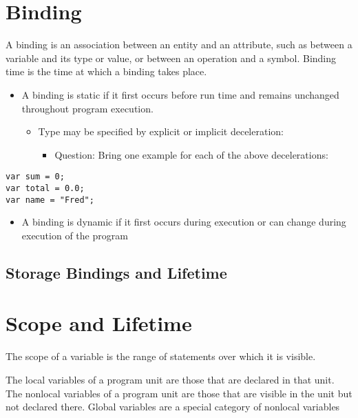 \documentclass[11pt]{article}
\begin{document}
\section{Binding}
\label{s3}
A binding is an association between an entity and an attribute, such as between
a variable and its type or value, or between an operation and a symbol. Binding
time is the time at which a binding takes place.

\begin{itemize}
\item A binding is static if it first occurs before run time and remains
unchanged throughout program execution.
\begin{itemize}
\item Type may be specified by explicit or implicit deceleration:

\begin{itemize}
\item Question: Bring one example for each of the above decelerations:
\end{itemize}
\end{itemize}
\end{itemize}

\begin{verbatim}
var sum = 0;
var total = 0.0;
var name = "Fred";
\end{verbatim}



\begin{itemize}
\item A binding is dynamic if it first occurs during execution or can change during
execution of the program
\end{itemize}

\subsection{Storage Bindings and Lifetime}
\label{sec:orge5f5087}



\section{Scope and Lifetime}
\label{s4}
The scope of a variable is the range of statements over which it is visible.

The local variables of a program unit are those that are declared in that unit.
The nonlocal variables of a program unit are those that are visible in the unit
but not declared there. Global variables are a special category of nonlocal variables
\end{document}
